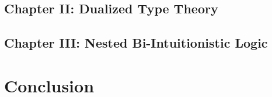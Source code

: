 
\subsection{Chapter II: Dualized Type Theory}
\label{subsubsec:dualized_type_theory}


\subsection{Chapter III: Nested Bi-Intuitionistic Logic}
\label{subsec:nested_bi-intuitionistic_logic}


\section{Conclusion}
\label{sec:conclusion}


 

